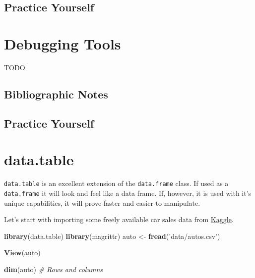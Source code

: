 \documentclass[]{book}
\newenvironment{Shaded}{\begin{snugshade}}{\end{snugshade}}
\newcommand{\KeywordTok}[1]{\textcolor[rgb]{0.13,0.29,0.53}{\textbf{#1}}}
\newcommand{\StringTok}[1]{\textcolor[rgb]{0.31,0.60,0.02}{#1}}
\newcommand{\CommentTok}[1]{\textcolor[rgb]{0.56,0.35,0.01}{\textit{#1}}}
\newcommand{\NormalTok}[1]{#1}
\theoremstyle{definition}
\theoremstyle{definition}
\theoremstyle{definition}
\theoremstyle{remark}
\begin{document}
\section{Practice Yourself}\label{practice-yourself-16}

\chapter{Debugging Tools}\label{debugging}

TODO

\section{Bibliographic Notes}\label{bibliographic-notes-16}

\section{Practice Yourself}\label{practice-yourself-17}

\chapter{data.table}\label{datatable}

\texttt{data.table} is an excellent extension of the \texttt{data.frame}
class. If used as a \texttt{data.frame} it will look and feel like a
data frame. If, however, it is used with it's unique capabilities, it
will prove faster and easier to manipulate.

Let's start with importing some freely available car sales data from
\href{https://www.kaggle.com/orgesleka/used-cars-database}{Kaggle}.

\begin{Shaded}
\begin{Highlighting}[]
\KeywordTok{library}\NormalTok{(data.table)}
\KeywordTok{library}\NormalTok{(magrittr)}
\NormalTok{auto <-}\StringTok{ }\KeywordTok{fread}\NormalTok{(}\StringTok{'data/autos.csv'}\NormalTok{)}
\end{Highlighting}
\end{Shaded}

\begin{Shaded}
\begin{Highlighting}[]
\KeywordTok{View}\NormalTok{(auto)}
\end{Highlighting}
\end{Shaded}

\begin{Shaded}
\begin{Highlighting}[]
\KeywordTok{dim}\NormalTok{(auto) }\CommentTok{#  Rows and columns}
\end{Highlighting}
\end{Shaded}
\end{document}
